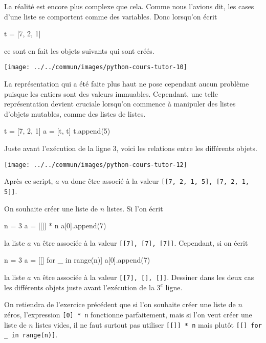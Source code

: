 \documentclass{magnolia}
\begin{document}
La réalité est encore plus complexe que cela. Comme nous l'avions dit, les cases d'une liste se
comportent comme des variables. Donc lorsqu'on écrit
\begin{pythoncodeline}
t = [7, 2, 1]
\end{pythoncodeline}
\noindent ce sont en fait les objets suivants qui sont créés.
\begin{center}
\texttt{[image: ../../commun/images/python-cours-tutor-10]}
\end{center}
La représentation qui a été faite plus haut ne pose cependant aucun problème puisque les entiers sont
des valeurs immuables. Cependant, une telle représentation devient cruciale lorsqu'on commence à manipuler
des listes d'objets mutables, comme des listes de listes.
\begin{pythoncodeline}
t = [7, 2, 1]
a = [t, t]
t.append(5)
\end{pythoncodeline}
\noindent Juste avant l'exécution de la ligne 3, voici les relations entre les différents objets.
\begin{center}
\texttt{[image: ../../commun/images/python-cours-tutor-12]}
\end{center}
Après ce script, $a$ va donc être associé à la valeur \verb![[7, 2, 1, 5], [7, 2, 1, 5]]!.
\vspace{2ex}
\begin{exoUnique}
\exo On souhaite créer une liste de $n$ listes. Si l'on écrit
\begin{pythoncodeline}
n = 3
a = [[]] * n
a[0].append(7)
\end{pythoncodeline}
  la liste $a$ va être associée à la valeur \verb![[7], [7], [7]]!. Cependant, si on écrit
\begin{pythoncodeline}
n = 3
a = [[] for _ in range(n)]
a[0].append(7)
\end{pythoncodeline}
la liste $a$ va être associée à la valeur \verb![[7], [], []]!. Dessiner dans les deux cas les différents objets
juste avant l'exécution de la $3^e$ ligne.
\end{exoUnique}
\vspace{2ex}
On retiendra de l'exercice précédent que si l'on souhaite créer une liste de $n$ zéros, l'expression
\verb![0] * n! fonctionne parfaitement, mais si l'on veut créer une liste de $n$ listes vides, il ne
faut surtout pas utiliser \verb![[]] * n! mais plutôt \verb![[] for _ in range(n)]!.\\
\end{document}
